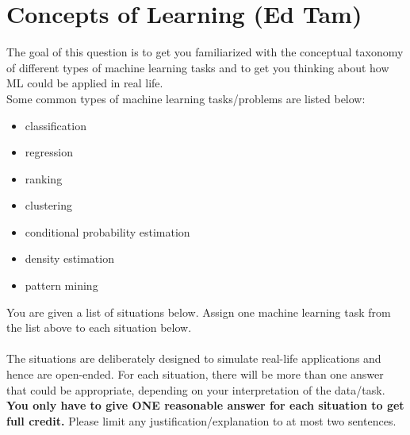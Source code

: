 \documentclass{exam}
\begin{document}
\newpage

\section{Concepts of Learning (Ed Tam)}

The goal of this question is to get you familiarized with the conceptual taxonomy of different types of machine learning tasks and to get you thinking about how ML could be applied in real life. \\
Some common types of machine learning tasks/problems are listed below:
\begin{itemize}
    \item classification
    \item regression
    \item ranking
    \item clustering
    \item conditional probability estimation
    \item density estimation
    \item pattern mining
\end{itemize}
You are given a list of situations below. Assign one machine learning task from the list above to each situation below. \\\\
The situations are deliberately designed to simulate real-life applications and hence are open-ended. For each situation, there will be more than one answer that could be appropriate, depending on your interpretation of the data/task. \textbf{You only have to give ONE reasonable answer for each situation to get full credit.} Please limit any justification/explanation to at most two sentences. 
\end{document}
